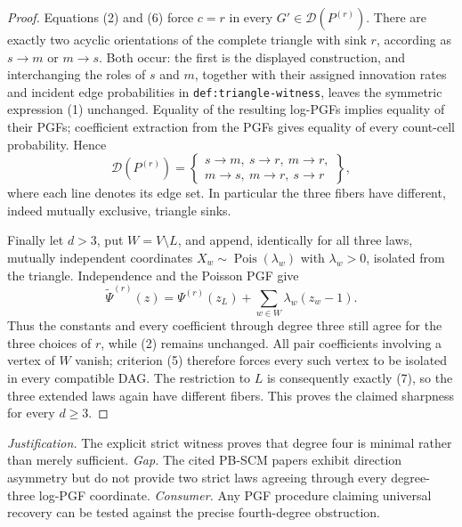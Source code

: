 \documentclass{article}
\begin{document}
\begin{proof}
Equations (2) and (6) force \(c=r\) in every \(G'\in\mathcal D(P^{(r)})\).  There are exactly two acyclic orientations of the complete triangle with sink \(r\), according as \(s\to m\) or \(m\to s\).  Both occur: the first is the displayed construction, and interchanging the roles of \(s\) and \(m\), together with their assigned innovation rates and incident edge probabilities in \texttt{def:triangle-witness}, leaves the symmetric expression (1) unchanged.  Equality of the resulting log-PGFs implies equality of their PGFs; coefficient extraction from the PGFs gives equality of every count-cell probability.  Hence
\[
\mathcal D(P^{(r)})=
\left\{
\begin{array}{l}
s\to m,\ s\to r,\ m\to r,\\
m\to s,\ m\to r,\ s\to r
\end{array}
\right\},
\tag{7}
\]
where each line denotes its edge set.  In particular the three fibers have different, indeed mutually exclusive, triangle sinks.

Finally let \(d>3\), put \(W=V\setminus L\), and append, identically for all three laws, mutually independent coordinates \(X_w\sim\operatorname{Pois}(\lambda_w)\) with \(\lambda_w>0\), isolated from the triangle.  Independence and the Poisson PGF give
\[
\widetilde\Psi^{(r)}(z)
=\Psi^{(r)}(z_L)+\sum_{w\in W}\lambda_w(z_w-1).
\tag{8}
\]
Thus the constants and every coefficient through degree three still agree for the three choices of \(r\), while (2) remains unchanged.  All pair coefficients involving a vertex of \(W\) vanish; criterion (5) therefore forces every such vertex to be isolated in every compatible DAG.  The restriction to \(L\) is consequently exactly (7), so the three extended laws again have different fibers.  This proves the claimed sharpness for every \(d\geq3\).
\end{proof}
\par\smallskip\noindent \textit{Justification.} The explicit strict witness proves that degree four is minimal rather than merely sufficient. \textit{Gap.} The cited PB-SCM papers exhibit direction asymmetry but do not provide two strict laws agreeing through every degree-three log-PGF coordinate. \textit{Consumer.} Any PGF procedure claiming universal recovery can be tested against the precise fourth-degree obstruction.
\end{document}
